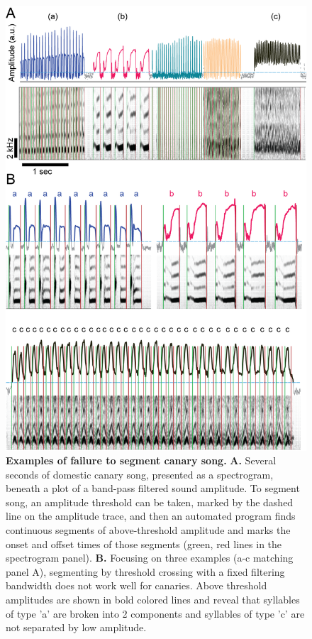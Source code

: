 \documentclass[10pt,letterpaper]{article}
\begin{document}
\begin{figure}[!ht]
\includegraphics[scale=0.2]{Figures/fig2/fig2_v2.png}
\caption{{\bf Examples of failure to segment canary song.}
\textbf{A.} Several seconds of domestic canary song, presented as a spectrogram, beneath a plot of a band-pass filtered sound amplitude. To segment song, an amplitude threshold can be taken, marked by the dashed line on the amplitude trace, and then an automated program finds continuous segments of above-threshold amplitude and marks the onset and offset times of those segments (green, red lines in the spectrogram panel). 
\textbf{B.} Focusing on three examples (a-c matching panel A), segmenting by threshold crossing with a fixed filtering bandwidth does not work well for canaries.  Above threshold amplitudes are shown in bold colored lines and reveal that syllables of type 'a' are broken into 2 components and syllables of type 'c' are not separated by low amplitude.}
\label{fig2}
\end{figure} 
\end{document}
